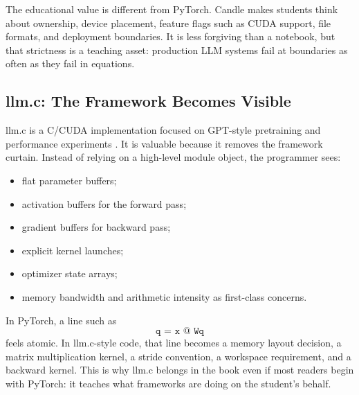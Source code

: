 The educational value is different from PyTorch. Candle makes students think about
ownership, device placement, feature flags such as CUDA support, file formats, and
deployment boundaries. It is less forgiving than a notebook, but that strictness is a
teaching asset: production LLM systems fail at boundaries as often as they fail in
equations.

\subsection{llm.c: The Framework Becomes Visible}

llm.c is a C/CUDA implementation focused on GPT-style pretraining and performance
experiments \cite{karpathyllmc}. It is valuable because it removes the framework curtain.
Instead of relying on a high-level module object, the programmer sees:

\begin{itemize}
  \item flat parameter buffers;
  \item activation buffers for the forward pass;
  \item gradient buffers for backward pass;
  \item explicit kernel launches;
  \item optimizer state arrays;
  \item memory bandwidth and arithmetic intensity as first-class concerns.
\end{itemize}

In PyTorch, a line such as
\[
\texttt{q = x @ Wq}
\]
feels atomic. In llm.c-style code, that line becomes a memory layout decision, a matrix
multiplication kernel, a stride convention, a workspace requirement, and a backward
kernel. This is why llm.c belongs in the book even if most readers begin with PyTorch:
it teaches what frameworks are doing on the student's behalf.


